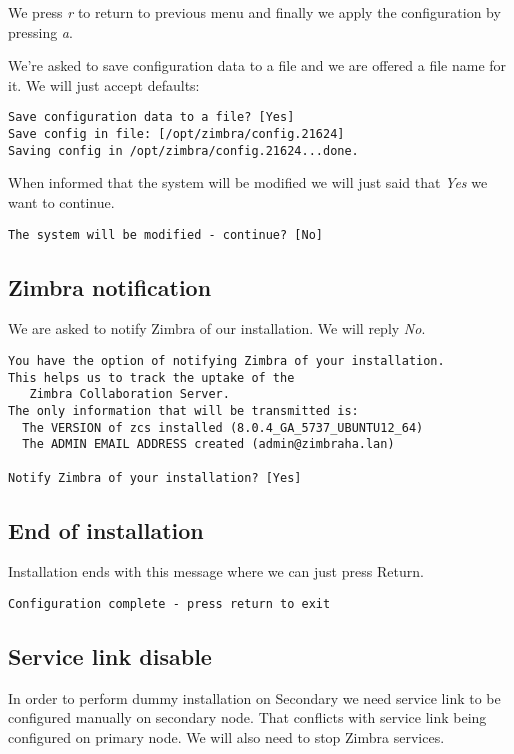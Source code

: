 We press \textit{r} to return to previous menu and finally we apply the configuration by pressing \textit{a}.

We're asked to save configuration data to a file and we are offered a file name for it. We will just accept defaults:
\begin{verbatim}
Save configuration data to a file? [Yes] 
Save config in file: [/opt/zimbra/config.21624] 
Saving config in /opt/zimbra/config.21624...done.
\end{verbatim}

When informed that the system will be modified we will just said that \textit{Yes} we want to continue.

\begin{verbatim}
The system will be modified - continue? [No] 
\end{verbatim}

\subsection {Zimbra notification}
We are asked to notify Zimbra of our installation. We will reply \textit{No}.

\begin{verbatim}
You have the option of notifying Zimbra of your installation.
This helps us to track the uptake of the
   Zimbra Collaboration Server.
The only information that will be transmitted is:
  The VERSION of zcs installed (8.0.4_GA_5737_UBUNTU12_64)
  The ADMIN EMAIL ADDRESS created (admin@zimbraha.lan)

Notify Zimbra of your installation? [Yes]
\end{verbatim}

\subsection {End of installation}
Installation ends with this message where we can just press Return.

\begin{verbatim}
Configuration complete - press return to exit
\end{verbatim}

\subsection {\label{service-link-disable}Service link disable}
In order to perform dummy installation on Secondary we need service link to be configured manually on secondary node. That conflicts with service link being configured on primary node. We will also need to stop Zimbra services.

